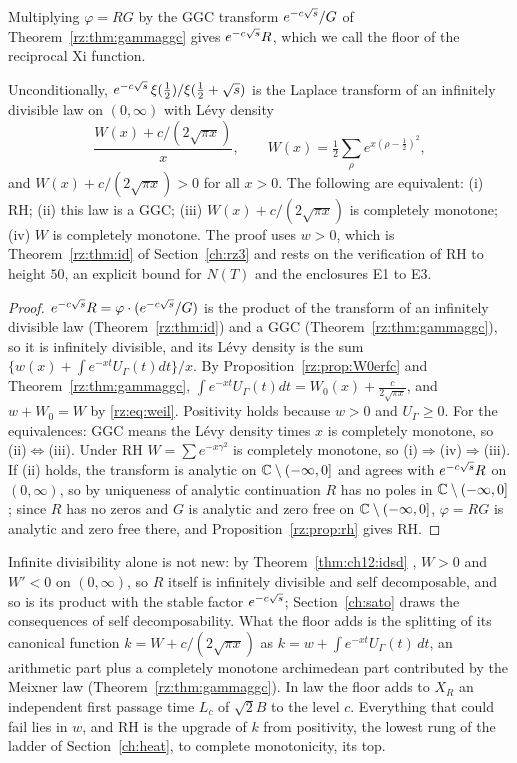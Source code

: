 Multiplying $\varphi=RG$ by the GGC transform $e^{-c\sqrt{s}}/G$ of Theorem~\ref{rz:thm:gammaggc} gives $e^{-c\sqrt{s}}R$, which we call the floor of the reciprocal Xi function.

\begin{theorem}\label{rz:thm:floor}
Unconditionally, $e^{-c\sqrt{s}}\,\xi(\frac12)/\xi(\frac12+\sqrt{s})$ is the Laplace transform of an infinitely divisible law on $(0,\infty)$ with L\'evy density
\[
\frac{W(x)+c/(2\sqrt{\pi x})}{x},\qquad W(x)=\tfrac12\sum_\rho e^{x(\rho-\frac12)^2},
\]
and $W(x)+c/(2\sqrt{\pi x})>0$ for all $x>0$. The following are equivalent: (i) RH; (ii) this law is a GGC; (iii) $W(x)+c/(2\sqrt{\pi x})$ is completely monotone; (iv) $W$ is completely monotone. The proof uses $w>0$, which is Theorem~\ref{rz:thm:id} of Section~\ref{ch:rz3} and rests on the verification of RH to height $50$, an explicit bound for $N(T)$ \cite{HSW22} and the enclosures E1 to E3.
\end{theorem}

\begin{proof}
$e^{-c\sqrt{s}}R=\varphi\cdot(e^{-c\sqrt{s}}/G)$ is the product of the transform of an infinitely divisible law (Theorem~\ref{rz:thm:id}) and a GGC (Theorem~\ref{rz:thm:gammaggc}), so it is infinitely divisible, and its L\'evy density is the sum $\{w(x)+\int e^{-xt}U_\Gamma(t)dt\}/x$. By Proposition~\ref{rz:prop:W0erfc} and Theorem~\ref{rz:thm:gammaggc}, $\int e^{-xt}U_\Gamma(t)dt=W_0(x)+\frac{c}{2\sqrt{\pi x}}$, and $w+W_0=W$ by \eqref{rz:eq:weil}. Positivity holds because $w>0$ and $U_\Gamma\ge0$. For the equivalences: GGC means the L\'evy density times $x$ is completely monotone, so (ii)$\Leftrightarrow$(iii). Under RH $W=\sum e^{-x\gamma^2}$ is completely monotone, so (i)$\Rightarrow$(iv)$\Rightarrow$(iii). If (ii) holds, the transform is analytic on $\mathbb{C}\setminus(-\infty,0]$ and agrees with $e^{-c\sqrt{s}}R$ on $(0,\infty)$, so by uniqueness of analytic continuation $R$ has no poles in $\mathbb{C}\setminus(-\infty,0]$; since $R$ has no zeros and $G$ is analytic and zero free on $\mathbb{C}\setminus(-\infty,0]$, $\varphi=RG$ is analytic and zero free there, and Proposition~\ref{rz:prop:rh} gives RH.
\end{proof}

Infinite divisibility alone is not new: by Theorem~\ref{thm:ch12:idsd} \cite[Theorem A]{P26}, $W>0$ and $W'<0$ on $(0,\infty)$, so $R$ itself is infinitely divisible and self decomposable, and so is its product with the stable factor $e^{-c\sqrt{s}}$; Section~\ref{ch:sato} draws the consequences of self decomposability. What the floor adds is the splitting of its canonical function $k=W+c/(2\sqrt{\pi x})$ as $k=w+\int e^{-xt}U_\Gamma(t)\,dt$, an arithmetic part plus a completely monotone archimedean part contributed by the Meixner law (Theorem~\ref{rz:thm:gammaggc}). In law the floor adds to $X_R$ an independent first passage time $L_c$ of $\sqrt2B$ to the level $c$. Everything that could fail lies in $w$, and RH is the upgrade of $k$ from positivity, the lowest rung of the ladder of Section~\ref{ch:heat}, to complete monotonicity, its top.

